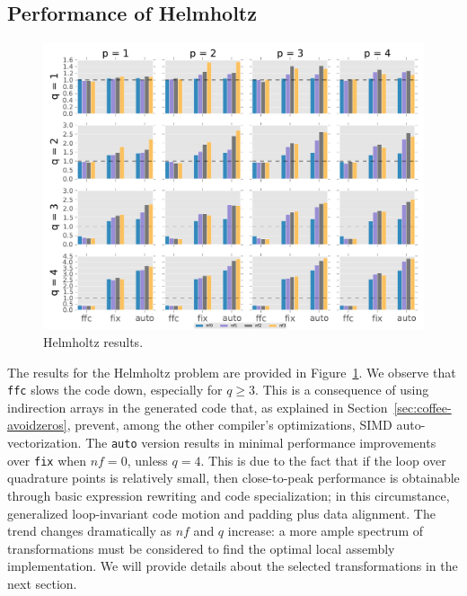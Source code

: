 \subsection{Performance of Helmholtz}
\begin{figure}[t]
\centerline{\includegraphics[scale=0.7]{coffee/perf-results/allforms/helmholtz}}
\caption{Helmholtz results.}\label{fig:coffee-allforms-helmholtz}
\end{figure}
The results for the Helmholtz problem are provided in Figure~\ref{fig:coffee-allforms-helmholtz}. We observe that \texttt{ffc} slows the code down, especially for $q \geq 3$. This is a consequence of using indirection arrays in the generated code that, as explained in Section~\ref{sec:coffee-avoidzeros}, prevent, among the other compiler's optimizations, SIMD auto-vectorization. The \texttt{auto} version results in minimal performance improvements over \texttt{fix} when $nf=0$, unless $q=4$. This is due to the fact that if the loop over quadrature points is relatively small, then close-to-peak performance is obtainable through basic expression rewriting and code specialization; in this circumstance, generalized loop-invariant code motion and padding plus data alignment. The trend changes dramatically as $nf$ and $q$ increase: a more ample spectrum of transformations must be considered to find the optimal local assembly implementation. We will provide details about the selected transformations in the next section.

